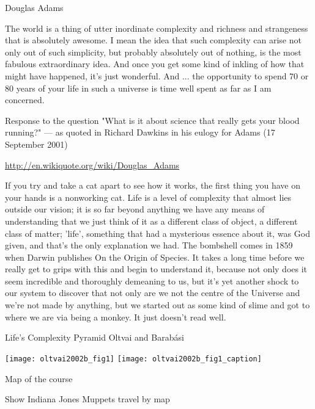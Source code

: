 \begin{frame}
  
Douglas Adams

The world is a thing of utter inordinate complexity and richness and
strangeness that is absolutely awesome. I mean the idea that such
complexity can arise not only out of such simplicity, but probably
absolutely out of nothing, is the most fabulous extraordinary
idea. And once you get some kind of inkling of how that might have
happened, it's just wonderful. And ... the opportunity to spend 70 or 80
years of your life in such a universe is time well spent as far as I
am concerned.

Response to the question "What is it about science that really gets
your blood running?" — as quoted in Richard Dawkins in his eulogy for
Adams (17 September 2001)

\url{http://en.wikiquote.org/wiki/Douglas_Adams}

If you try and take a cat apart to see how it works, the first thing
you have on your hands is a nonworking cat. Life is a level of
complexity that almost lies outside our vision; it is so far beyond
anything we have any means of understanding that we just think of it
as a different class of object, a different class of matter; 'life',
something that had a mysterious essence about it, was God given, and
that's the only explanation we had. The bombshell comes in 1859 when
Darwin publishes On the Origin of Species. It takes a long time before
we really get to grips with this and begin to understand it, because
not only does it seem incredible and thoroughly demeaning to us, but
it's yet another shock to our system to discover that not only are we
not the centre of the Universe and we're not made by anything, but we
started out as some kind of slime and got to where we are via being a
monkey. It just doesn't read well.

\end{frame}

\begin{frame}
Life's Complexity Pyramid\cite{oltvai2002b}
  Oltvai and Barab\'{a}si

  \texttt{[image: oltvai2002b\_fig1]}
  \texttt{[image: oltvai2002b\_fig1\_caption]}
\end{frame}

\begin{frame}
  
Map of the course

Show Indiana Jones
Muppets travel by map

\end{frame}

